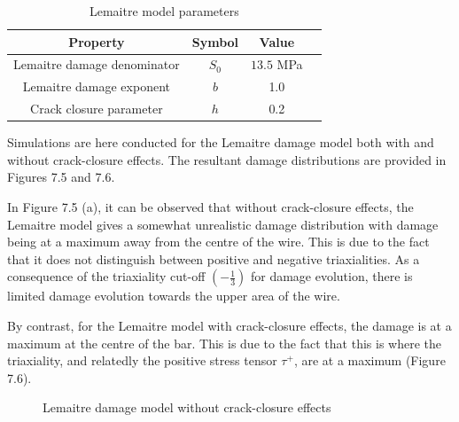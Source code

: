 \documentclass[sn-mathphys,Numbered,draft]{sn-jnl}%
\begin{document}
\begin{table}[htb]
	\centering
		\begin{tabular}{cccc} \hline
			Property & Symbol & Value  \\ \hline 
			Lemaitre damage denominator & $S_0$ & $13.5$ MPa  \\
			Lemaitre damage exponent & $b$ & 1.0  \\
            Crack closure parameter & $h$ & 0.2 \\
			\hline
		\end{tabular}
	\caption{Lemaitre model parameters}
	\label{tab:material_properties}
\end{table}

Simulations are here conducted for the Lemaitre damage model both with and without crack-closure effects. The resultant damage distributions are provided in Figures 7.5 and 7.6. 

In Figure 7.5 (a), it can be observed that without crack-closure effects, the Lemaitre model gives a somewhat unrealistic damage distribution with damage being at a maximum away from the centre of the wire. This is due to the fact that it does not distinguish between positive and negative triaxialities.  As a consequence of the triaxiality cut-off  $\left(-\frac{1}{3}\right)$ for damage evolution, there is limited damage evolution towards the upper area of the wire.

By contrast, for the Lemaitre model with crack-closure effects, the damage is at a maximum at the centre of the bar. This is due to the fact that this is where the triaxiality, and relatedly the positive stress tensor $\tau^+$, are at a maximum (Figure 7.6). 

\begin{figure}[t!]
	\centering
	  \qquad
		
		\caption{Lemaitre damage model without crack-closure effects}
	\label{label_for_entire_figure}
\end{figure}
\FloatBarrier
\end{document}
